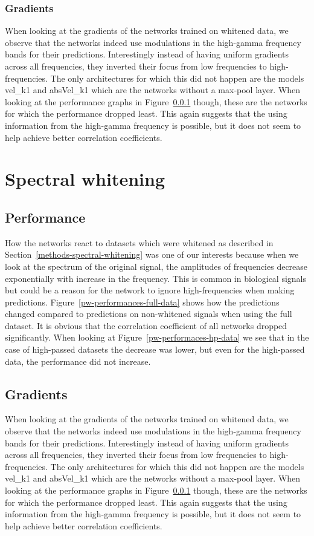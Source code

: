 \subsubsection{Gradients}
When looking at the gradients of the networks trained on whitened data, we observe that the networks indeed use modulations in the high-gamma frequency bands for their predictions.
Interestingly instead of having uniform gradients across all frequencies, they inverted their focus from low frequencies to high-frequencies.
The only architectures for which this did not happen are the models vel\_k1 and absVel\_k1 which are the networks without a max-pool layer.
When looking at the performance graphs in Figure~\ref{} though, these are the networks for which the performance dropped least.
This again suggests that the using information from the high-gamma frequency is possible, but it does not seem to help achieve better correlation coefficients.

\section{Spectral whitening}\label{sec:spectral-whitening}

\subsection{Performance}\label{subsec:pw-performance}
How the networks react to datasets which were whitened as described in Section~\ref{methods-spectral-whitening} was one of our interests because when we look at the spectrum of the original signal, the amplitudes of frequencies decrease exponentially with increase in the frequency.
This is common in biological signals but could be a reason for the network to ignore high-frequencies when making predictions. Figure~\ref{pw-performances-full-data} shows how the predictions changed compared to predictions on non-whitened signals when using the full dataset.
It is obvious that the correlation coefficient of all networks dropped significantly. When looking at Figure~\ref{pw-performaces-hp-data} we see that in the case of high-passed datasets the decrease was lower, but even for the high-passed data, the performance did not increase.

\subsection{Gradients}\label{subsec:pw-gradients2}

When looking at the gradients of the networks trained on whitened data, we observe that the networks indeed use modulations in the high-gamma frequency bands for their predictions.
Interestingly instead of having uniform gradients across all frequencies, they inverted their focus from low frequencies to high-frequencies.
The only architectures for which this did not happen are the models vel\_k1 and absVel\_k1 which are the networks without a max-pool layer.
When looking at the performance graphs in Figure~\ref{} though, these are the networks for which the performance dropped least.
This again suggests that the using information from the high-gamma frequency is possible, but it does not seem to help achieve better correlation coefficients.